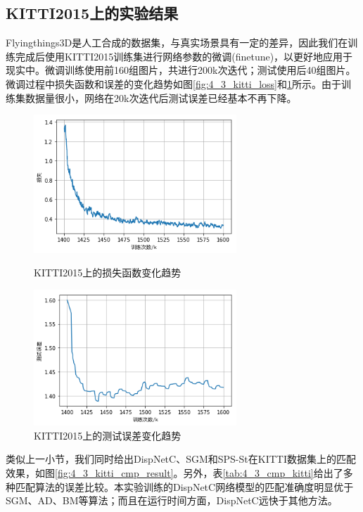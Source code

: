 \subsection{KITTI2015上的实验结果}
Flyingthings3D是人工合成的数据集，与真实场景具有一定的差异，因此我们在训练完成后使用KITTI2015训练集进行网络参数的微调(finetune)，以更好地应用于现实中。微调训练使用前160组图片，共进行200k次迭代；测试使用后40组图片。微调过程中损失函数和误差的变化趋势如图\ref{fig:4_3_kitti_loss}和\ref{fig:4_3_test_error}所示。由于训练集数据量很小，网络在20k次迭代后测试误差已经基本不再下降。

\begin{figure}[htbp]
	\centering
	\begin{minipage}[c]{0.48\textwidth}
		\centering
		\includegraphics[width=3in]{figures/4_3_kitti_loss}
		\caption{KITTI2015上的损失函数变化趋势}\label{fig:4_3_kitti_loss}
	\end{minipage}
	\hfill
	\begin{minipage}[c]{0.48\textwidth}
		\centering
		\includegraphics[width=3in]{figures/4_3_kitti_test_error}
		\caption{KITTI2015上的测试误差变化趋势}\label{fig:4_3_test_error}
	\end{minipage}
\end{figure}

类似上一小节，我们同时给出DispNetC、SGM和SPS-St在KITTI数据集上的匹配效果，如图\ref{fig:4_3_kitti_cmp_result}。另外，表\ref{tab:4_3_cmp_kitti}给出了多种匹配算法的误差比较\cite{Menze_2015_CVPR}\cite{陈拓2017CCNN}。本实验训练的DispNetC网络模型的匹配准确度明显优于SGM、AD、BM等算法；而且在运行时间方面，DispNetC远快于其他方法。


